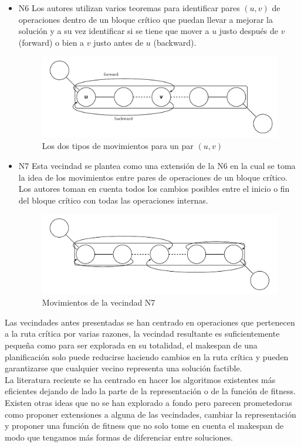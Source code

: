 \begin{itemize}
\item N6 \cite{Balas1998} Los autores utilizan varios teoremas para identificar pares $(u,v)$ de operaciones dentro de un bloque crítico que puedan llevar a mejorar la solución y a su vez identificar si se tiene que mover a $u$ justo después de $v$(forward) o bien a $v$ justo antes de $u$ (backward).
\begin{figure}[H]
\centering
\includegraphics[scale=.7]{Imagenes/N6.pdf}
\caption{Los dos tipos de movimientos para un par $(u,v)$}
\end{figure}

\item N7 \cite{Zhang2007} Esta vecindad se plantea como una extensión de la N6 en la cual se toma la idea de los movimientos entre pares de operaciones de un bloque crítico. Los autores toman en cuenta todos los cambios posibles entre el inicio o fin del bloque crítico con todas las operaciones internas.

\begin{figure}[H]
\centering
\includegraphics[scale=.7]{Imagenes/N7.pdf}
\caption{Movimientos de la vecindad N7}
\end{figure}
\end{itemize}

Las vecindades antes presentadas se han centrado en operaciones que pertenecen a la ruta crítica por varias razones, la vecindad resultante es suficientemente pequeña como para ser explorada en su totalidad, el makespan de una planificación solo puede reducirse haciendo cambios en la ruta crítica y pueden garantizarse que cualquier vecino representa una solución factible.\\

La literatura reciente se ha centrado en hacer los algoritmos existentes más eficientes dejando de lado la parte de la representación o de la función de fitness. Existen otras ideas que no se han explorado a fondo pero parecen prometedoras como proponer extensiones a alguna de las vecindades, cambiar la representación y proponer una función de fitness que no solo tome en cuenta el makespan de modo que tengamos más formas de diferenciar entre soluciones.

